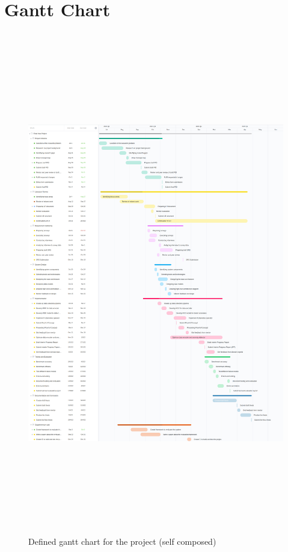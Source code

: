 \chapter{Gantt Chart}\label{appendix:gantt-chart}

\begin{figure}[H]
    \centering
    \includegraphics[height=22cm]{assets/methodology/gantt-chart.jpg}
    \caption{Defined gantt chart for the project (self composed)}
\end{figure}